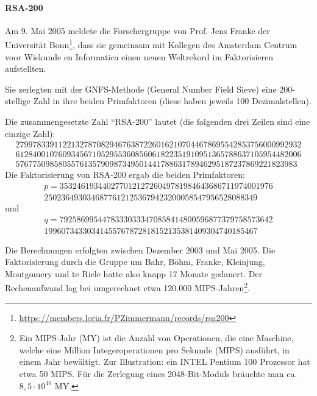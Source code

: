 \begin{refsegment}
\hypertarget{RSA-200-chap3}{}
\paragraph*{RSA-200} \label{RSA-200} \mbox{}
\nopagebreak

Am 9. Mai 2005 meldete die Forschergruppe von Prof. Jens Franke der Universität Bonn\footnote{%
   \url{https://members.loria.fr/PZimmermann/records/rsa200}
   },
dass sie gemeinsam mit Kollegen des Amsterdam Centrum voor Wiskunde en Informatica
einen neuen Weltrekord im Faktorisieren aufstellten.

Sie zerlegten mit der GNFS-Methode (General Number Field Sieve)  eine $200$-stellige Zahl in ihre beiden Primfaktoren
(diese haben jeweils 100 Dezimalstellen).

Die zusammengesetzte Zahl "`RSA-200"' lautet (die folgenden drei Zeilen
sind eine einzige Zahl):
$$
\begin{array}{c}
2799783391122132787082946763872260162107044678695542853756000992932\\
6128400107609345671052955360856061822351910951365788637105954482006\\
576775098580557613579098734950144178863178946295187237869221823983
\end{array}
$$
Die Faktorisierung von RSA-200 ergab die beiden Primfaktoren:
$$
\begin{array}{c}
p = 35324619344027701212726049781984643686711974001976\\
    25023649303468776121253679423200058547956528088349
\end{array}
$$
und
$$
\begin{array}{c}
q = 79258699544783330333470858414800596877379758573642\\
    19960734330341455767872818152135381409304740185467
\end{array}
$$

Die Berechnungen erfolgten zwischen Dezember 2003 und Mai 2005.
Die Faktorisierung durch die Gruppe um Bahr, Böhm, Franke, Kleinjung,
Montgomery und te Riele hatte also knapp 17 Monate gedauert.
Der Rechenaufwand lag bei umgerechnet etwa 120.000 MIPS-Jahren\footnote{%
Ein MIPS-Jahr (MY) ist die Anzahl von Operationen, die eine Maschine,
welche eine Million Integeroperationen pro Sekunde (MIPS)
ausführt, in einem Jahr bewältigt. Zur Illustration: ein INTEL
Pentium 100 Prozessor hat etwa 50 MIPS.
Für die Zerlegung eines 2048-Bit-Moduls bräuchte man ca. {$8,5 \cdot
10^{40}$ MY}.}.





\end{refsegment}
